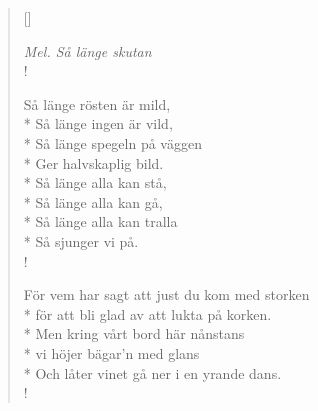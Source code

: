 
\settowidth{\versewidth}{För att bli glad av att lukta på korken.}



\begin{verse}[\versewidth]

\flagverse{}
\emph{Mel. Så länge skutan}\\!

Så länge rösten är mild,\\*
Så länge ingen är vild,\\*
Så länge spegeln på väggen\\*
Ger halvskaplig bild.\\*
Så länge alla kan stå,\\*
Så länge alla kan gå,\\*
Så länge alla kan tralla\\*
Så sjunger vi på.\\!


För vem har sagt att just du kom med storken\\*
för att bli glad av att lukta på korken.\\*
Men kring vårt bord här nånstans\\*
vi höjer bägar'n med glans\\*
Och låter vinet gå ner i en yrande dans.\\!


\end{verse}

